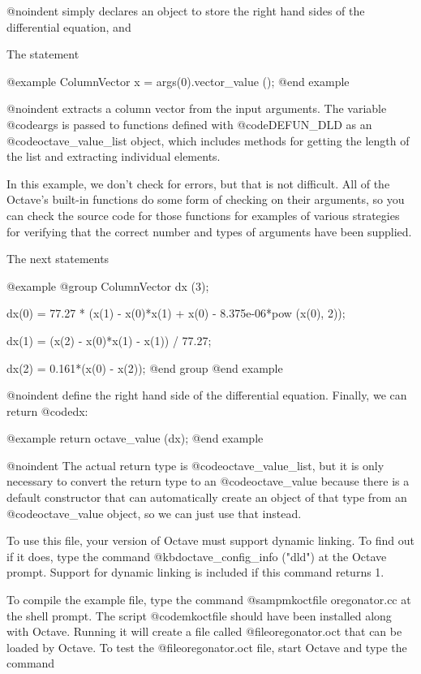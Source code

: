 @noindent
simply declares an object to store the right hand sides of the
differential equation, and

The statement

@example
ColumnVector x = args(0).vector_value ();
@end example

@noindent
extracts a column vector from the input arguments.  The variable
@code{args} is passed to functions defined with @code{DEFUN_DLD} as an
@code{octave_value_list} object, which includes methods for getting the
length of the list and extracting individual elements.

In this example, we don't check for errors, but that is not difficult.
All of the Octave's built-in functions do some form of checking on their
arguments, so you can check the source code for those functions for
examples of various strategies for verifying that the correct number and
types of arguments have been supplied.

The next statements

@example
@group
ColumnVector dx (3);

dx(0) = 77.27 * (x(1) - x(0)*x(1) + x(0)
                 - 8.375e-06*pow (x(0), 2));

dx(1) = (x(2) - x(0)*x(1) - x(1)) / 77.27;

dx(2) = 0.161*(x(0) - x(2));
@end group
@end example

@noindent
define the right hand side of the differential equation.  Finally, we
can return @code{dx}:

@example
return octave_value (dx);
@end example

@noindent
The actual return type is @code{octave_value_list}, but it is only
necessary to convert the return type to an @code{octave_value} because
there is a default constructor that can automatically create an object
of that type from an @code{octave_value} object, so we can just use that
instead.

To use this file, your version of Octave must support dynamic linking.
To find out if it does, type the command
@kbd{octave_config_info ("dld")} at the Octave prompt.  Support for
dynamic linking is included if this command returns 1.

To compile the example file, type the command @samp{mkoctfile
oregonator.cc} at the shell prompt.  The script @code{mkoctfile} should
have been installed along with Octave.  Running it will create a file
called @file{oregonator.oct} that can be loaded by Octave.  To test the
@file{oregonator.oct} file, start Octave and type the command

